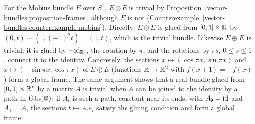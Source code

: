 \begin{example}\label{vector-bundles:example-mobius-square}
For the M\"obius bundle $E$ over $S^1$, $E \otimes E$ is trivial by Proposition~\ref{vector-bundles:proposition-frames}, although $E$ is not (Counterexample~\ref{vector-bundles:counterexample-mobius}). Directly: $E \otimes E$ is glued from
$[0, 1] \times \mathbb{R}$ by $(0, t) \sim (1, (-1)^2t) = (1, t)$, which is the trivial bundle. Likewise $E \oplus E$ is trivial: it is glued by $-\mathrm{id}_{\mathbb{R}^2}$, the rotation by $\pi$, and the rotations by $\pi s$, $0 \leq s \leq 1$,
connect it to the identity. Concretely, the sections $x \mapsto (\cos\pi x, \sin\pi x)$ and $x \mapsto (-\sin\pi x, \cos\pi x)$ of $E \oplus E$ (functions $\mathbb{R} \to \mathbb{R}^2$ with
$f(x + 1) = -f(x)$) form a global frame. The same argument shows that a real bundle glued from $[0, 1] \times \mathbb{R}^r$ by a matrix $A$ is trivial when $A$ can be joined to the identity by a path in $\mathrm{GL}_r(\mathbb{R})$: if $A_t$ is such a path, constant near its ends, with $A_0 = \mathrm{id}$ and $A_1 = A$,
the sections $t \mapsto A_te_i$ satisfy the gluing condition and form a global frame.
\end{example}

